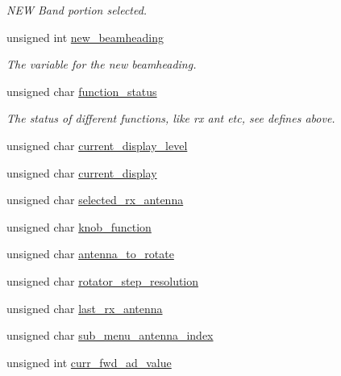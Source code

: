 \begin{CompactItemize}
\begin{CompactList}\small\item\em NEW Band portion selected. \item\end{CompactList}\item 
\hypertarget{structstruct__status_8de41cea2cd98a300addaff2eca383e8}{
unsigned int \hyperlink{structstruct__status_8de41cea2cd98a300addaff2eca383e8}{new\_\-beamheading}}
\label{structstruct__status_8de41cea2cd98a300addaff2eca383e8}

\begin{CompactList}\small\item\em The variable for the new beamheading. \item\end{CompactList}\item 
\hypertarget{structstruct__status_c807865f5c47c3a6563f6ea7744d4ba5}{
unsigned char \hyperlink{structstruct__status_c807865f5c47c3a6563f6ea7744d4ba5}{function\_\-status}}
\label{structstruct__status_c807865f5c47c3a6563f6ea7744d4ba5}

\begin{CompactList}\small\item\em The status of different functions, like rx ant etc, see defines above. \item\end{CompactList}\item 
unsigned char \hyperlink{structstruct__status_751519c9ba01b235d43e19b758c3a127}{current\_\-display\_\-level}
\item 
unsigned char \hyperlink{structstruct__status_5a07897b99cf7c72c0c543b5157043c8}{current\_\-display}
\item 
unsigned char \hyperlink{structstruct__status_3e606ec5f1d11ef7e66c1e6f88ea43eb}{selected\_\-rx\_\-antenna}
\item 
unsigned char \hyperlink{structstruct__status_95ed8ab2c7b3d131d9478e3a2b8d772c}{knob\_\-function}
\item 
unsigned char \hyperlink{structstruct__status_058a4d1fe0aa8518467dafffe213d091}{antenna\_\-to\_\-rotate}
\item 
unsigned char \hyperlink{structstruct__status_6a7f9fd7c692fe1ad0d0d9ed79b8d85b}{rotator\_\-step\_\-resolution}
\item 
unsigned char \hyperlink{structstruct__status_a676f93ffd0700bb574a0ca35961cd2d}{last\_\-rx\_\-antenna}
\item 
unsigned char \hyperlink{structstruct__status_da4ee4abf8490aa07c3f42bd4a2bb767}{sub\_\-menu\_\-antenna\_\-index}
\item 
\hypertarget{structstruct__status_b9adafcde406f5995b77816d4d6ce82c}{
unsigned int \hyperlink{structstruct__status_b9adafcde406f5995b77816d4d6ce82c}{curr\_\-fwd\_\-ad\_\-value}}
\label{structstruct__status_b9adafcde406f5995b77816d4d6ce82c}


\end{CompactItemize}
